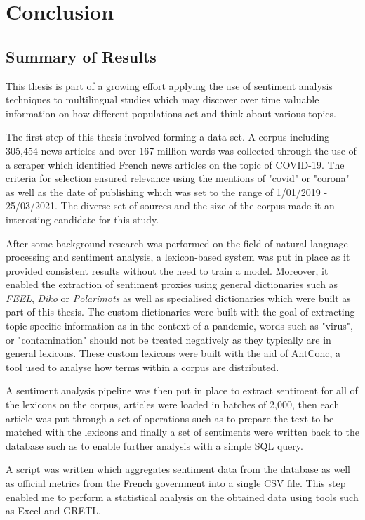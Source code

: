 \chapter{Conclusion}\label{Conclusion}

\section{Summary of Results}

This thesis is part of a growing effort applying the use of sentiment analysis techniques to multilingual studies which may discover over time valuable information on how different populations act and think about various topics.

The first step of this thesis involved forming a data set. A corpus including 305,454 news articles and over 167 million words was collected through the use of a scraper which identified French news articles on the topic of COVID-19. The criteria for selection ensured relevance using the mentions of "covid" or "corona" as well as the date of publishing which was set to the range of 1/01/2019 - 25/03/2021. The diverse set of sources and the size of the corpus made it an interesting candidate for this study.

After some background research was performed on the field of natural language processing and sentiment analysis, a lexicon-based system was put in place as it provided consistent results without the need to train a model. Moreover, it enabled the extraction of sentiment proxies using general dictionaries such as \emph{FEEL}, \emph{Diko} or \emph{Polarimots} as well as specialised dictionaries which were built as part of this thesis. The custom dictionaries were built with the goal of extracting topic-specific information as in the context of a pandemic, words such as "virus", or "contamination" should not be treated negatively as they typically are in general lexicons. These custom lexicons were built with the aid of AntConc, a tool used to analyse how terms within a corpus are distributed.

A sentiment analysis pipeline was then put in place to extract sentiment for all of the lexicons on the corpus, articles were loaded in batches of 2,000, then each article was put through a set of operations such as to prepare the text to be matched with the lexicons and finally a set of sentiments were written back to the database such as to enable further analysis with a simple SQL query. 

A script was written which aggregates sentiment data from the database as well as official metrics from the French government into a single CSV file. This step enabled me to perform a statistical analysis on the obtained data using tools such as Excel and GRETL.

